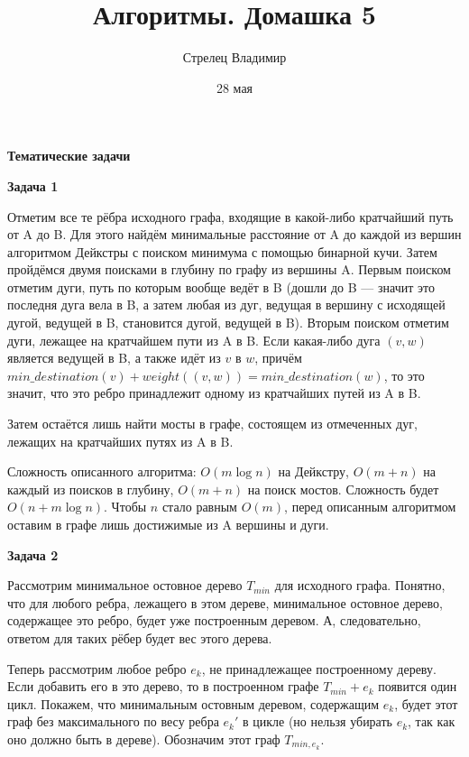 \documentclass[12pt]{article}
\title{Алгоритмы. Домашка 5}
\author{Стрелец Владимир}
\date{28 мая}
\begin{document}
	
	\maketitle
	
	\textbf{\Large Тематические задачи}
	\newline
	
	\textbf{\large Задача 1}
	
	Отметим все те рёбра исходного графа, входящие в какой-либо кратчайший путь от A до B. Для этого найдём минимальные расстояние от A до каждой из вершин алгоритмом Дейкстры с поиском минимума с помощью бинарной кучи. Затем пройдёмся двумя поисками в глубину по графу из вершины A. Первым поиском отметим дуги, путь по которым вообще ведёт в B (дошли до B --- значит это последня дуга вела в B, а затем любая из дуг, ведущая в вершину с исходящей дугой, ведущей в B, становится дугой, ведущей в B). Вторым поиском отметим дуги, лежащее на кратчайшем пути из A в B. Если какая-либо дуга $ (v, w) $ является ведущей в B, а также идёт из $ v $ в $ w $, причём $ min\_destination(v) + weight((v, w)) = min\_destination(w) $, то это значит, что это ребро принадлежит одному из кратчайших путей из A в B.
	
	Затем остаётся лишь найти мосты в графе, состоящем из отмеченных дуг, лежащих на кратчайших путях из A в B.
	
	Сложность описанного алгоритма: $ O(m \log{n}) $ на Дейкстру, $ O(m + n) $ на каждый из поисков в глубину, $ O(m + n) $ на поиск мостов. Сложность будет $ O(n + m \log{n}) $. Чтобы $ n $ стало равным $ O(m) $, перед описанным алгоритмом оставим в графе лишь достижимые из A вершины и дуги.
	\newline
	
	\textbf{\large Задача 2}
	
	Рассмотрим минимальное остовное дерево $ T_{min} $ для исходного графа. Понятно, что для любого ребра, лежащего в этом дереве, минимальное остовное дерево, содержащее это ребро, будет уже построенным деревом. А, следовательно, ответом для таких рёбер будет вес этого дерева.
	
	Теперь рассмотрим любое ребро $ e_k $, не принадлежащее построенному дереву. Если добавить его в это дерево, то в построенном графе $ T_{min} + e_k $ появится один цикл. Покажем, что минимальным остовным деревом, содержащим $ e_k $, будет этот граф без максимального по весу ребра $ e_k' $ в цикле (но нельзя убирать $ e_k $, так как оно должно быть в дереве). Обозначим этот граф $ T_{min, e_k} $.
	
\end{document}
